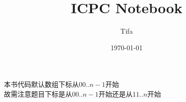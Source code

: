 \documentclass{ICPCnotebook}
\title{\vspace{-4ex}\Large{ICPC Notebook}}
\author{Tifa}
\date{\today}
\begin{document}
    \maketitle

    \pagestyle{plain}

	\setcounter{page}{1}

    \begin{multicols}{2}
        \tableofcontents
    \end{multicols}

    \newpage

	\pagestyle{fancy}
	\setcounter{page}{1}

    \begin{multicols}{2}
        本书代码默认数组下标从0\(0..n-1\)开始\\
        故需注意题目下标是从0\(0..n-1\)开始还是从1\(1..n\)开始
        
        
    \end{multicols}

    
    
\end{document}
